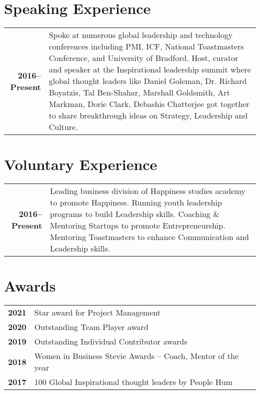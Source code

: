 \documentclass[lighthipster]{simplehipstercv}
\begin{document}
\begin{paracol}{2}
\begin{minipage}[t]{0.3\textwidth}
\section*{Speaking Experience}
\begin{tabular}{>{\footnotesize\bfseries}r >{\footnotesize}p{}}
    2016--Present & Spoke at numerous global leadership and technology conferences including PMI, ICF, National Toastmasters Conference, and University of Bradford. Host, curator and speaker at the Inspirational leadership summit where global thought leaders like Daniel Goleman, Dr. Richard Boyatzis, Tal Ben-Shahar, Marshall Goldsmith, Art Markman, Dorie Clark, Debashis Chatterjee got together to share breakthrough ideas on Strategy, Leadership and Culture.
\end{tabular}
\bigskip

\section*{Voluntary Experience}
\begin{tabular}{>{\footnotesize\bfseries}r >{\footnotesize}p{}}
    2016--Present & Leading business division of Happiness studies academy to promote Happiness. Running youth leadership programs to build Leadership skills. Coaching \& Mentoring Startups to promote Entrepreneurship. Mentoring Toastmasters to enhance Communication and Leadership skills.
\end{tabular}
\bigskip

\section*{Awards}
\begin{tabular}{>{\footnotesize\bfseries}r >{\footnotesize}p{}}
    2021 & Star award for Project Management \\
    2020 & Outstanding Team Player award \\
    2019 & Outstanding Individual Contributor awards \\
    2018 & Women in Business Stevie Awards – Coach, Mentor of the year \\
    2017 & 100 Global Inspirational thought leaders by People Hum
\end{tabular}
\bigskip

\end{minipage}\hfill


\end{paracol}
\end{document}
